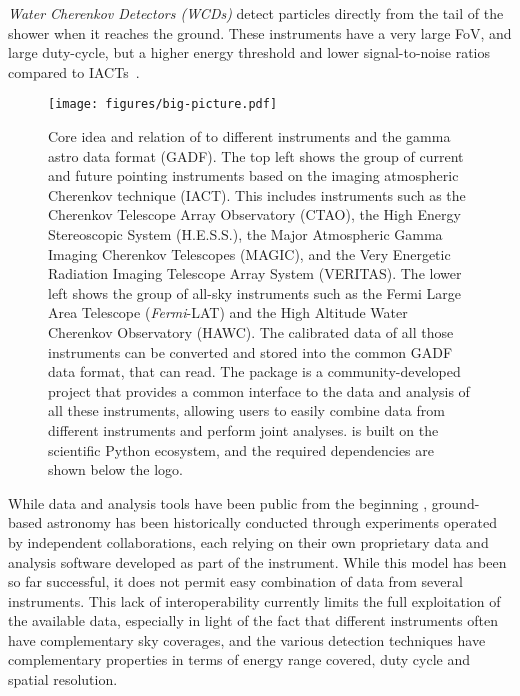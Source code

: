 \documentclass[longauth]{aa}
\begin{document}
\textit{Water Cherenkov Detectors (WCDs)} detect particles directly from the tail of the
shower when it reaches the ground. These instruments have a very
large FoV, and large duty-cycle, but a higher energy threshold and
lower signal-to-noise ratios compared to IACTs~\citep{2015CRPhy..16..610D}.


\begin{figure*}[t]
	\centering
	\texttt{[image: figures/big-picture.pdf]}
	\caption{
		Core idea and relation of \gammapy to different \gammaray instruments
		and the gamma astro data format (GADF). The top left shows the
		group of current and future pointing instruments based on the 
		imaging atmospheric Cherenkov technique (IACT). This includes
		instruments such as the Cherenkov Telescope Array Observatory (CTAO),
		the High Energy Stereoscopic System (H.E.S.S.), the
		Major Atmospheric Gamma Imaging Cherenkov Telescopes (MAGIC),
		and the Very Energetic Radiation Imaging Telescope Array System (VERITAS).
		The lower left shows the group of all-sky instruments such as the
		Fermi Large Area Telescope (\textit{Fermi}-LAT) and the High Altitude
		Water Cherenkov Observatory (HAWC). The calibrated data of all those
		instruments can be converted and stored into the common GADF data format, that \gammapy can read.
		The \gammapy package is a community-developed project that
		provides a common interface to the data and analysis of all
		these \gammaray instruments, allowing users to easily combine data from
		different instruments and perform joint analyses.
		\gammapy is built on the scientific Python ecosystem, and the required dependencies
		are shown below the \gammapy logo.
	}
	\label{fig:big_picture}

\end{figure*}


While \fermi data and analysis tools have been public from the
beginning \citep{}, ground-based \gammaray astronomy has been historically conducted
through experiments operated by independent collaborations, each relying
on their own proprietary data and analysis software developed as part of the
instrument. While this model has been so far successful, it does not
permit easy combination of data from several instruments. This lack of
interoperability currently limits the full exploitation of the
available \gammaray data, especially in light of the fact that different instruments often have
complementary sky coverages, and the various detection
techniques have complementary properties in terms of energy range covered,
duty cycle and spatial resolution.
\end{document}
